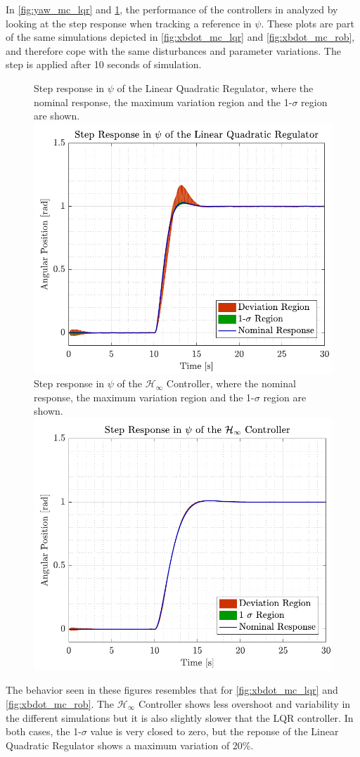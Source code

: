 In \autoref{fig:yaw_mc_lqr} and \ref{fig:yaw_mc_rob}, the performance of the controllers in analyzed by looking at the step response when tracking a reference in $\psi$. These plots are part of the same simulations depicted in \autoref{fig:xbdot_mc_lqr} and \ref{fig:xbdot_mc_rob}, and therefore cope with the same disturbances and parameter variations. The step is applied after 10 seconds of simulation.
\begin{figure}[H]
    \captionbox 
    {   
        Step response in $\psi$ of the Linear Quadratic Regulator, where the nominal response, the maximum variation region and the 1-$\sigma$ region are shown.
        \label{fig:yaw_mc_lqr}
    }                                                                 
    {                                                                  
        \includegraphics[width=.45\textwidth]{figures/yaw_mc_lqr}         
    }                                                                    
    \hspace{5pt}                                                          
    \captionbox  
    {   
        Step response in $\psi$ of the $\mathcal{H}_\infty$ Controller, where the nominal response, the maximum variation region and the 1-$\sigma$ region are shown.   
        \label{fig:yaw_mc_rob}
    }                                                                          
    {
        \includegraphics[width=.45\textwidth]{figures/yaw_mc_rob}
    }
\end{figure}

The behavior seen in these figures resembles that for \autoref{fig:xbdot_mc_lqr} and \ref{fig:xbdot_mc_rob}. The $\mathcal{H}_\infty$ Controller shows less overshoot and variability in the different simulations but it is also slightly slower that the LQR controller. In both cases, the 1-$\sigma$ value is very closed to zero, but the reponse of the Linear Quadratic Regulator shows a maximum variation of 20\%.

